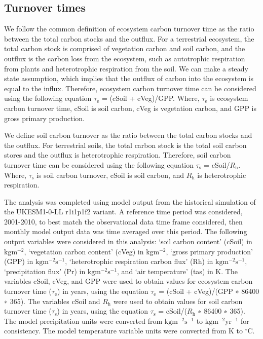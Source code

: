 \subsection{Turnover times}
We follow the common definition of ecosystem carbon turnover time as the ratio between the total carbon stocks and the outflux. For a terrestrial ecosystem, the total carbon stock is comprised of vegetation carbon and soil carbon, and the outflux is the carbon loss from the ecosystem, such as autotrophic respiration from plants and heterotrophic respiration from the soil. We can make a steady state assumption, which implies that the outflux of carbon into the ecosystem is equal to the influx.  Therefore, ecosystem carbon turnover time can be considered using the following equation $\tau_\mathrm{e}$ = (cSoil + cVeg)/GPP. Where, $\tau_\mathrm{e}$ is ecosystem carbon turnover time, cSoil is soil carbon, cVeg is vegetation carbon, and GPP is gross primary production.

We define soil carbon turnover as the ratio between the total carbon stocks and the outflux. For terrestrial soils, the total carbon stock is the total soil carbon stores and the outflux is heterotrophic respiration. Therefore, soil carbon turnover time can be considered using the following equation $\tau_\mathrm{s}$ = cSoil/$R_\mathrm{h}$. Where, $\tau_\mathrm{s}$ is soil carbon turnover, cSoil is soil carbon, and $R_\mathrm{h}$ is heterotrophic respiration.

The analysis was completed using model output from the historical simulation of the UKESM1-0-LL r1i1p1f2 variant. A reference time period was considered, 2001-2010, to best match the observational data time frame considered, then monthly model output data was time averaged over this period. The following output variables were considered in this analysis: ‘soil carbon content’ (cSoil) in $\mathrm{kg} \mathrm{m}^{−2}$, ‘vegetation carbon content’ (cVeg) in $\mathrm{kg} \mathrm{m}^{−2}$, ‘gross primary production’ (GPP) in $\mathrm{kg} \mathrm{m}^{−2} \mathrm{s}^{−1}$,  ‘heterotrophic respiration carbon flux’ (Rh) in $\mathrm{kg} \mathrm{m}^{−2} \mathrm{s}^{−1}$, ‘precipitation flux’ (Pr) in $\mathrm{kg} \mathrm{m}^{−2} \mathrm{s}^{−1}$, and ‘air temperature’ (tas) in K.
The variables cSoil, cVeg, and GPP were used to obtain values for ecosystem carbon turnover time ($\tau_\mathrm{e}$) in years, using the equation $\tau_\mathrm{e}$ = (cSoil + cVeg)/(GPP ∗ 86400 ∗ 365). The variables cSoil and $R_\mathrm{h}$ were used to obtain values for soil carbon turnover time ($\tau_\mathrm{s}$) in years, using the equation $\tau_\mathrm{s}$ = cSoil/($R_\mathrm{h}$ ∗ 86400 ∗ 365). The model precipitation units were converted from $\mathrm{kg} \mathrm{m}^{−2} \mathrm{s}^{−1}$ to $\mathrm{kg} \mathrm{m}^{−2} \mathrm{yr}^{−1}$ for consistency. The model temperature variable units were converted from K to $^\circ$C. 